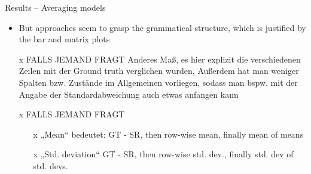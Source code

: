 \begin{frame}{Results – Averaging models}
{\begin{itemize}
    \item But \onehot{} approaches seem to grasp the grammatical structure, which is justified by the bar and matrix plots   
    \item[x] FALLS JEMAND FRAGT Anderes Maß, es hier explizit die verschiedenen Zeilen mit der Ground truth verglichen wurden, Außerdem hat man weniger Spalten bzw. Zustände im Allgemeinen vorliegen, sodass man bspw. mit der Angabe der Standardabweichung auch etwas anfangen kann
    \item[x] FALLS JEMAND FRAGT
    \begin{itemize}
        \item[x] „Mean“ bedeutet: GT - SR, then row-wise mean, finally mean of means
        \item[x] „Std. deviation“ GT - SR, then row-wise std. dev., finally std. dev of std. devs.
    \end{itemize}
\end{itemize}
}
\end{frame}